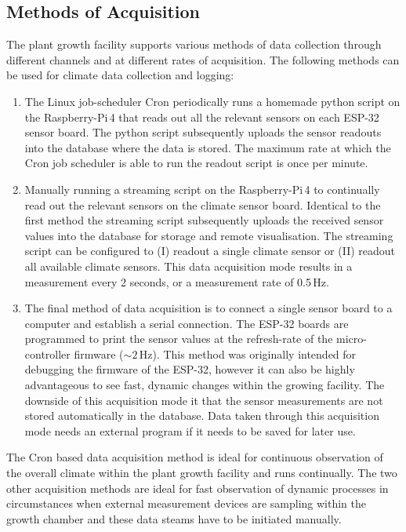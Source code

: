 \documentclass[reprint,superscriptaddress,aps,amsmath,amssymb]{revtex4-1}
\begin{document}
\subsection{Methods of Acquisition}
The plant growth facility supports various methods of data collection through different channels and at different rates of acquisition. The following methods can be used for climate data collection and logging:
\begin{enumerate}
    \item The Linux job-scheduler Cron periodically runs a homemade python script on the Raspberry-Pi\,4 that reads out all the relevant sensors on each ESP-32 sensor board. The python script subsequently uploads the sensor readouts into the database where the data is stored. The maximum rate at which the Cron job scheduler is able to run the readout script is once per minute.
    \item Manually running a streaming script on the Raspberry-Pi\,4 to continually read out the relevant sensors on the climate sensor board. Identical to the first method the streaming script subsequently uploads the received sensor values into the database for storage and remote visualisation. The streaming script can be configured to (I) readout a single climate sensor or (II) readout all available climate sensors. This data acquisition mode results in a measurement every 2 seconds, or a measurement rate of 0.5\,Hz.
    \item The final method of data acquisition is to connect a single sensor board to a computer and establish a serial connection. The ESP-32 boards are programmed to print the sensor values at the refresh-rate of the micro-controller firmware ($\sim2$\,Hz). This method was originally intended for debugging the firmware of the ESP-32, however it can also be highly advantageous to see fast, dynamic changes within the growing facility. The downside of this acquisition mode it that the sensor measurements are not stored automatically in the database. Data taken through this acquisition mode needs an external program if it needs to be saved for later use. 
\end{enumerate}
The Cron based data acquisition method is ideal for continuous observation of the overall climate within the plant growth facility and runs continually. The two other acquisition methods are ideal for fast observation of dynamic processes in circumstances when external measurement devices are sampling within the growth chamber and these data steams have to be initiated manually.
\end{document}
